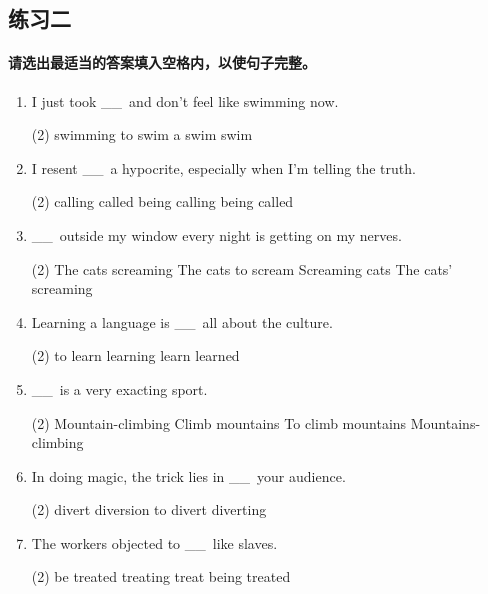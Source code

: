 \documentclass{yufa}
\newcommand\ttu{ \_\_\ }
\begin{document}
\subsection{练习二}

\paragraph{请选出最适当的答案填入空格内，以使句子完整。}

\begin{enumerate}
\item I just took \ttu and don't feel like swimming now.
  \begin{tasks}(2)
    \task swimming
    \task to swim
    \task a swim
    \task swim
  \end{tasks}

\item I resent \ttu a hypocrite, especially when I'm telling the truth.
  \begin{tasks}(2)
    \task calling
    \task called
    \task being calling
    \task being called
  \end{tasks}

\item \ttu outside my window every night is getting on my nerves.
  \begin{tasks}(2)
    \task The cats screaming
    \task The cats to scream
    \task Screaming cats
    \task The cats' screaming
  \end{tasks}

\item Learning a language is \ttu all about the culture.
  \begin{tasks}(2)
    \task to learn
    \task learning
    \task learn
    \task learned
  \end{tasks}

\item \ttu is a very exacting sport.
  \begin{tasks}(2)
    \task Mountain-climbing
    \task Climb mountains
    \task To climb mountains
    \task Mountains-climbing
  \end{tasks}

\item In doing magic, the trick lies in \ttu your audience.
  \begin{tasks}(2)
    \task divert
    \task diversion
    \task to divert
    \task diverting
  \end{tasks}

\item The workers objected to \ttu like slaves.
  \begin{tasks}(2)
    \task be treated
    \task treating
    \task treat
    \task being treated
  \end{tasks}


\end{enumerate}
\end{document}
